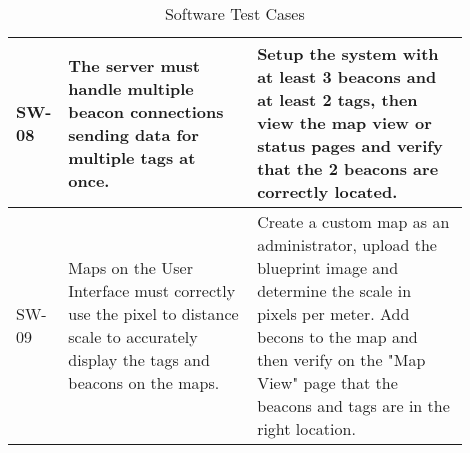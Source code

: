 \bigskip
\bgroup
\def\arraystretch{1.25}
\begin{table}[h!]
    \centering
    \begin{tabular}{|p{0.05\linewidth}|p{0.40\linewidth}|p{0.45\linewidth}|}

    \hline
    SW-08
    & The server must handle multiple beacon connections sending data for multiple tags at once.
    & Setup the system with at least 3 beacons and at least 2 tags, then view the map view or status pages and verify that the 2 beacons are correctly located. \\

    \hline
    SW-09
    & Maps on the User Interface must correctly use the pixel to distance scale to accurately display the tags and beacons on the maps.
    & Create a custom map as an administrator, upload the blueprint image and determine the scale in pixels per meter. Add becons to the map and then verify on the "Map View" page that the beacons and tags are in the right location. \\

    \hline
    \end{tabular}
    \caption{Software Test Cases}
\end{table}
